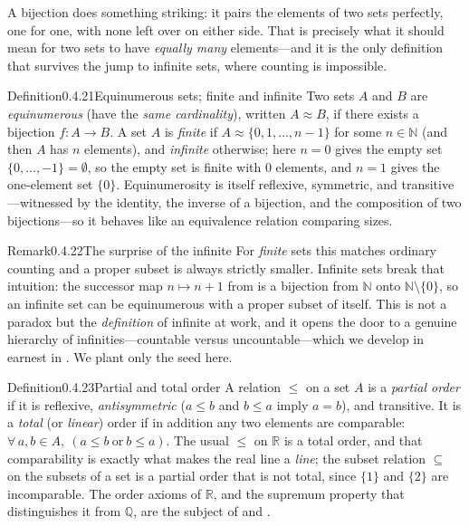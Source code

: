 \documentclass[main.tex]{subfiles}
\begin{document}
\noindent A bijection does something striking: it pairs the elements of two sets perfectly, one for
one, with none left over on either side. That is precisely what it should mean for two sets to have
\emph{equally many} elements---and it is the only definition that survives the jump to infinite sets,
where counting is impossible.

\begin{Obj}{Definition}{0.4.21}{Equinumerous sets; finite and infinite}
Two sets $A$ and $B$ are \emph{equinumerous} (have the \emph{same cardinality}), written
$A\approx B$, if there exists a bijection $f\colon A\to B$. A set $A$ is \emph{finite} if
$A\approx\{0,1,\dots,n-1\}$ for some $n\in\mathbb N$ (and then $A$ has $n$ elements), and
\emph{infinite} otherwise; here $n=0$ gives the empty set $\{0,\dots,-1\}=\emptyset$, so the empty set
is finite with $0$ elements, and $n=1$ gives the one-element set $\{0\}$. Equinumerosity is itself
reflexive, symmetric, and transitive---witnessed by the identity, the inverse of a bijection, and the
composition of two bijections---so it behaves like an equivalence relation comparing sizes.
\end{Obj}

\begin{ObjL}{Remark}{0.4.22}{The surprise of the infinite}
For \emph{finite} sets this matches ordinary counting and a proper subset is always strictly smaller.
Infinite sets break that intuition: the successor map $n\mapsto n+1$ from  is a bijection
from $\mathbb N$ onto $\mathbb N\setminus\{0\}$, so an infinite set can be equinumerous with a
proper subset of itself. This is not a paradox but the \emph{definition} of infinite at work, and it
opens the door to a genuine hierarchy of infinities---countable versus uncountable---which we develop
in earnest in . We plant only the seed here.
\end{ObjL}

\begin{Obj}{Definition}{0.4.23}{Partial and total order}
A relation $\le$ on a set $A$ is a \emph{partial order} if it is reflexive, \emph{antisymmetric}
($a\le b$ and $b\le a$ imply $a=b$), and transitive. It is a \emph{total} (or \emph{linear}) order if
in addition any two elements are comparable: $\forall\,a,b\in A,\ (a\le b\ \text{or}\ b\le a)$. The
usual $\le$ on $\mathbb R$ is a total order, and that comparability is exactly what makes the real line
a \emph{line}; the subset relation $\subseteq$ on the subsets of a set is a partial order that is not
total, since $\{1\}$ and $\{2\}$ are incomparable. The order axioms of $\mathbb R$, and the supremum
property that distinguishes it from $\mathbb Q$, are the subject of  and .
\end{Obj}
\end{document}
